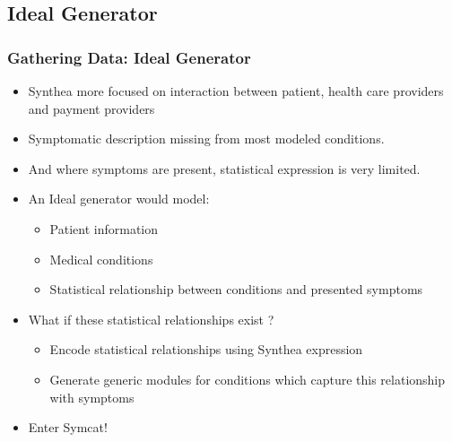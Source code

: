 \documentclass{beamer}
\begin{document}
\subsection{Ideal Generator}
\begin{frame}
\frametitle{Gathering Data: Ideal Generator}
\begin{itemize}
	\item Synthea more focused on interaction between patient, health care providers and payment providers
	\item Symptomatic description missing from most modeled conditions.
	\item And where symptoms are present, statistical expression is very limited.
	\item An Ideal generator would model:
		\begin{itemize}
			\item Patient information
			\item Medical conditions
			\item Statistical relationship between conditions and presented symptoms
		\end{itemize}
	\item What if these statistical relationships exist ?
		\begin{itemize}
			\item Encode statistical relationships using Synthea expression
			\item Generate generic modules for conditions which capture this relationship with symptoms
		\end{itemize}
	\item Enter Symcat!
\end{itemize}
\end{frame}
\end{document}
